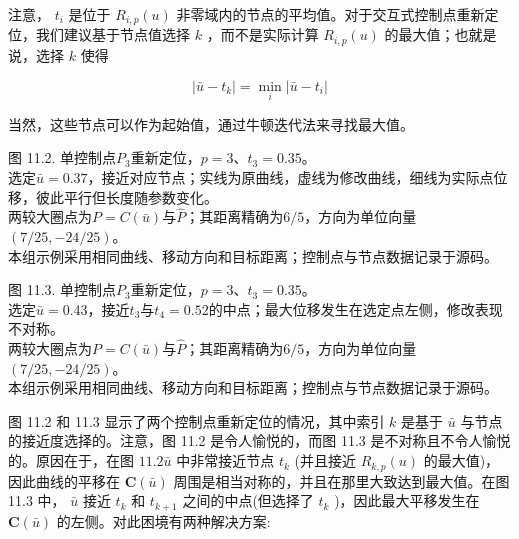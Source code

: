 \documentclass[../main.tex]{subfiles}
\begin{document}
注意， \({t}_{i}\) 是位于 \({R}_{i,p}\left( u\right)\) 非零域内的节点的平均值。对于交互式控制点重新定位，我们建议基于节点值选择 \(k\) ，而不是实际计算 \({R}_{i,p}\left( u\right)\) 的最大值；也就是说，选择 \(k\) 使得

\[
\left| {\bar{u} - {t}_{k}}\right|  = \mathop{\min }\limits_{i}\left| {\bar{u} - {t}_{i}}\right|  \tag{11.5}
\]

当然，这些节点可以作为起始值，通过牛顿迭代法来寻找最大值。



\begin{center}
\begin{minipage}{26cm}
\vspace*{.6\baselineskip}
\centering
{}
\par\smallskip
图 11.2. 单控制点$P_3$重新定位，$p=3$、$t_3=0.35$。\\
选定$\bar u=0.37$，接近对应节点；实线为原曲线，虚线为修改曲线，细线为实际点位移，彼此平行但长度随参数变化。\\
两较大圈点为$P=C(\bar u)$与$\widehat P$；其距离精确为$6/5$，方向为单位向量$(7/25,-24/25)$。\\
本组示例采用相同曲线、移动方向和目标距离；控制点与节点数据记录于源码。
\end{minipage}
\end{center}



\begin{center}
\begin{minipage}{26cm}
\vspace*{.6\baselineskip}
\centering
{}
\par\smallskip
图 11.3. 单控制点$P_3$重新定位，$p=3$、$t_3=0.35$。\\
选定$\bar u=0.43$，接近$t_3$与$t_4=0.52$的中点；最大位移发生在选定点左侧，修改表现不对称。\\
两较大圈点为$P=C(\bar u)$与$\widehat P$；其距离精确为$6/5$，方向为单位向量$(7/25,-24/25)$。\\
本组示例采用相同曲线、移动方向和目标距离；控制点与节点数据记录于源码。
\end{minipage}
\end{center}

图 11.2 和 11.3 显示了两个控制点重新定位的情况，其中索引 \(k\) 是基于 \(\bar{u}\) 与节点的接近度选择的。注意，图 11.2 是令人愉悦的，而图 11.3 是不对称且不令人愉悦的。原因在于，在图 \({11.2}\bar{u}\) 中非常接近节点 \({t}_{k}\) (并且接近 \({R}_{k,p}\left( u\right)\) 的最大值)，因此曲线的平移在 \(\mathbf{C}\left( \bar{u}\right)\) 周围是相当对称的，并且在那里大致达到最大值。在图 11.3 中， \(\bar{u}\) 接近 \({t}_{k}\) 和 \({t}_{k + 1}\) 之间的中点(但选择了 \({t}_{k}\) )，因此最大平移发生在 \(\mathbf{C}\left( \bar{u}\right)\) 的左侧。对此困境有两种解决方案:
\end{document}
